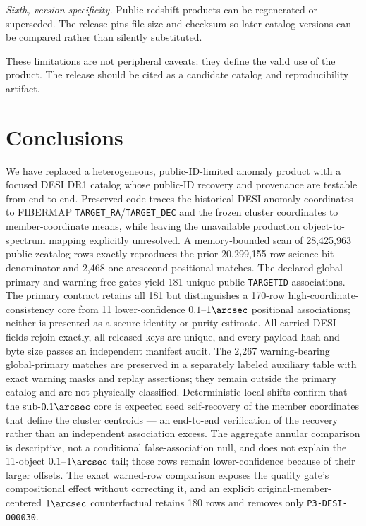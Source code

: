 \documentclass[twocolumn,linenumbers]{aastex702}
\begin{document}
\textit{Sixth, version specificity.}  Public redshift products can be regenerated or superseded.
The release pins file size and checksum so later catalog versions can be compared rather than
silently substituted.

These limitations are not peripheral caveats: they define the valid use of the product.  The
release should be cited as a candidate catalog and reproducibility artifact.

\section{Conclusions}\label{sec:conclusions}

We have replaced a heterogeneous, public-ID-limited anomaly product with a focused DESI DR1
catalog whose public-ID recovery and provenance are testable from end to end.  Preserved code traces
the historical DESI anomaly coordinates to FIBERMAP \texttt{TARGET\_RA}/\texttt{TARGET\_DEC} and
the frozen cluster coordinates to member-coordinate means, while leaving the unavailable production
object-to-spectrum mapping explicitly unresolved.  A memory-bounded scan of
28,425,963 public zcatalog rows exactly reproduces the prior 20,299,155-row science-bit denominator
and 2,468 one-arcsecond positional matches.  The declared global-primary and warning-free gates
yield 181 unique public \texttt{TARGETID} associations.  The primary contract retains all 181 but
distinguishes a 170-row high-coordinate-consistency core from 11 lower-confidence $0.1$--$1\arcsec$
positional associations; neither is presented as a secure identity or purity estimate.  All carried
DESI fields rejoin exactly, all released
keys are unique, and every payload hash and byte size passes an independent manifest audit.
The 2,267 warning-bearing global-primary matches are preserved in a separately labeled auxiliary
table with exact warning masks and replay assertions; they remain outside the primary catalog and
are not physically classified.
Deterministic local shifts confirm that the sub-$0.1\arcsec$ core is expected seed self-recovery of
the member coordinates that define the cluster centroids --- an end-to-end verification of the
recovery rather than an independent association excess.  The aggregate annular comparison is
descriptive, not a conditional false-association null, and does not explain the 11-object
$0.1$--$1\arcsec$ tail; those rows remain lower-confidence because of their larger offsets.  The exact warned-row
comparison exposes the quality gate's compositional effect without correcting it, and an explicit
original-member-centered $1\arcsec$ counterfactual retains 180 rows and removes only
\texttt{P3-DESI-000030}.
\end{document}
